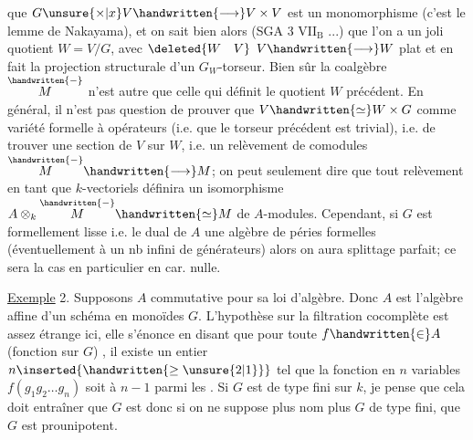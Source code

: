 que $G\unsure{\times|x}V\handwritten{\longrightarrow}V\times V$ est un monomorphisme (c'est le lemme de Nakayama), et on sait bien alors (SGA 3 $\mathrm{VII}_{\mathrm{B}}$ ...) que  l'on a un joli quotient $W=V/G$, avec $\deleted{W\quad V}$ $V\handwritten{\longrightarrow}W$ plat et en fait la projection structurale d'un $G_{W}$-torseur. Bien sûr la coalgèbre $\overset{\handwritten{-}}{M}$ n'est autre que celle qui définit le quotient $W$ précédent. En général, il n'est pas question de prouver que $V\handwritten{\simeq}W\times G$ comme variété formelle à opérateurs (i.e. que le torseur précédent est trivial), i.e. de trouver une section de $V$ sur $W$, i.e. un relèvement de comodules $\overset{\handwritten{-}}{M}\handwritten{\longrightarrow}M$; on peut seulement dire que tout relèvement en tant que $k$-vectoriels définira un isomorphisme $A\otimes_{k}\overset{\handwritten{-}}{M}\handwritten{\simeq}M$ de $A$-modules. Cependant, si $G$ est formellement lisse i.e. le dual de $A$ une algèbre de péries formelles (éventuellement à un nb infini de générateurs) alors on aura splittage parfait; ce sera la cas en particulier en car. nulle.

\uline{Exemple} 2. Supposons $A$ commutative pour sa loi d'algèbre. Donc $A$ est l'algèbre affine d'un schéma en monoïdes  $G$. L'hypothèse sur la filtration cocomplète est assez étrange ici, elle s'énonce en disant que pour toute $f\handwritten{\in}A$ (fonction sur $G$) , il existe un entier $n\inserted{\handwritten{\geq\unsure{2|1}}}$ tel que la fonction en $n$ variables $f(g_{1}g_{2}\ldots g_{n})$ soit  à $n-1$ parmi les . Si $G$ est de type fini sur $k$, je pense que  cela doit entraîner que  $G$ est  donc si on ne suppose plus nom plus $G$ de type fini, que $G$ est  prounipotent.

